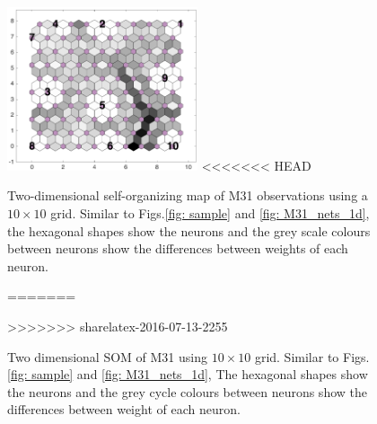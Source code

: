 \begin{figure}
        \centering
        \includegraphics[width=0.5\textwidth]{../../images0.01/M31/2D/diff_dimension/combine_2D_data_between_cols3and26.png}
<<<<<<< HEAD
    \caption{Two-dimensional self-organizing map of M31 observations using a $10\times10$ grid. Similar to Figs.\ref{fig: sample} and \ref{fig: M31_nets_1d}, the hexagonal shapes show the neurons and the grey scale colours between neurons show the differences between weights of each neuron.}
=======
    \caption{Two dimensional SOM of M31 using $10\times10$ grid. Similar to Figs.\ref{fig: sample} and \ref{fig: M31_nets_1d}, The hexagonal shapes show the neurons and the grey cycle colours between neurons show the differences between weight of each neuron.}
>>>>>>> sharelatex-2016-07-13-2255
    \label{fig: all_derived_ones}
\end{figure}
